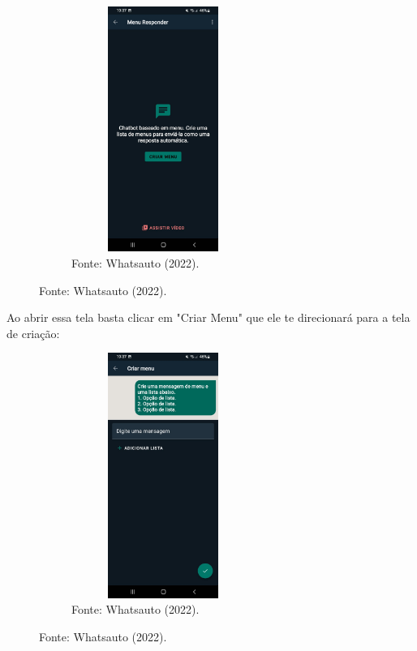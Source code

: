 \begin{itemize}
\begin{figure}[!htb]
\centering
\captionsetup[subfigure]{labelformat=empty}
\caption{``Menu 1''}
\begin{subfigure}{.5\textwidth}
\centering
\includegraphics[width=6cm,height=8cm]{Partes/Imagens/Menu 1.jpeg}
\caption{Fonte: Whatsauto (2022).}
\end{subfigure}%
\end{figure}

        Ao abrir essa tela basta clicar em "Criar Menu" que ele te direcionará para a tela de criação:

\begin{figure}[!htb]
\centering
\captionsetup[subfigure]{labelformat=empty}
\caption{``Menu 2''}
\begin{subfigure}{.5\textwidth}
\centering
\includegraphics[width=6cm,height=8cm]{Partes/Imagens/Menu 2.jpeg}
\caption{Fonte: Whatsauto (2022).}
\end{subfigure}%
\end{figure}


\end{itemize}
